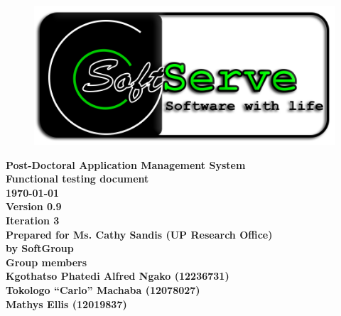 \documentclass[12pt]{article}
\newcommand{\Title}{Functional testing document} %
\newcommand{\ssr}{Soft\color{green}{Serve }\color{black}}
\newcommand{\version}{0.9}
\newcommand{\iteration}{3}
\newcommand{\client}{Ms. Cathy Sandis (UP Research Office)}
\newcommand{\project}{Post-Doctoral Application Management System}
\begin{document}
\vspace{4em}

\begin{center}%

\begin{figure}[ht!]
\centering
\includegraphics{../Images_Docs/logo.png}
\end{figure}
\LARGE \bf \project \\[1em]
\LARGE \bf \Title \\[0.25em]
\large \bf \today\\
\bf Version \version\\
\bf Iteration \iteration\\[0.5em]
\Large \bf Prepared for \client\\
\Large \bf by
\Large {\bf \ssr Group }\\[0.5em]
\LARGE {\bf Group members}\\[0.25em]
\large
Kgothatso Phatedi Alfred Ngako (12236731) \\[0.5em]
Tokologo “Carlo” Machaba (12078027) \\[0.5em]
Mathys Ellis (12019837) \\[8em]

\end{center}%

\end{document}

